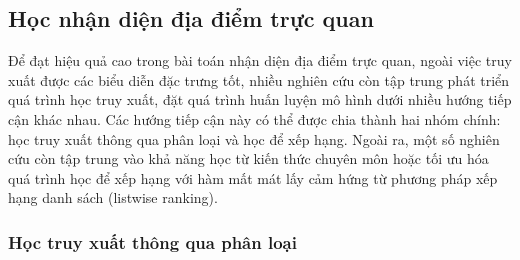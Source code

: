 \subsection{Học nhận diện địa điểm trực quan}

Để đạt hiệu quả cao trong bài toán nhận diện địa điểm trực quan, ngoài việc truy xuất được các biểu diễn đặc trưng tốt, nhiều nghiên cứu còn tập trung phát triển quá trình học truy xuất, đặt quá trình huấn luyện mô hình dưới nhiều hướng tiếp cận khác nhau. Các hướng tiếp cận này có thể được chia thành hai nhóm chính: học truy xuất thông qua phân loại và học để xếp hạng. Ngoài ra, một số nghiên cứu còn tập trung vào khả năng học từ kiến thức chuyên môn hoặc tối ưu hóa quá trình học để xếp hạng với hàm mất mát lấy cảm hứng từ phương pháp xếp hạng danh sách (listwise ranking).

\subsubsection{Học truy xuất thông qua phân loại}

